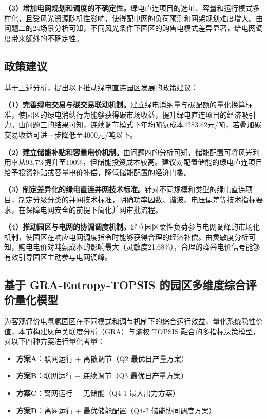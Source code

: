 \textbf{（3）增加电网规划和调度的不确定性。}绿电直连项目的选址、容量和运行模式多样化，且受风光资源随机性影响，使得配电网的负荷预测和网架规划难度增大。由问题二的24场景分析可知，不同风光条件下园区的购售电模式差异显著，给电网调度带来额外的不确定性。

\subsection{政策建议}

基于上述分析，提出以下推动绿电直连园区发展的政策建议：

\textbf{（1）完善绿电交易与碳交易联动机制。}建立绿电消纳量与碳配额的量化换算标准，使园区的绿电消纳行为能够获得碳市场收益，提升绿电直连项目的经济吸引力。由问题三的结果可知，连续调节模式下年均吨氨成本4283.62元/吨，若叠加碳交易收益可进一步降低至4000元/吨以下。

\textbf{（2）建立储能补贴和容量电价机制。}由问题四的分析可知，储能配置可将风光利用率从93.7\%提升至100\%，但储能投资成本较高。建议对配置储能的绿电直连项目给予投资补贴或容量电价补偿，降低储能配置的经济门槛。

\textbf{（3）制定差异化的绿电直连并网技术标准。}针对不同规模和类型的绿电直连项目，制定分级分类的并网技术标准，明确功率因数、谐波、电压偏差等技术指标要求，在保障电网安全的前提下简化并网审批流程。

\textbf{（4）推动园区与电网的协调调度机制。}建立园区柔性负荷参与电网调峰的市场化机制，使园区在响应电网调度指令时能够获得合理的经济补偿。由灵敏度分析可知，购电电价对吨氨成本的影响最大（灵敏度21.68\%），合理的峰谷电价信号能够有效引导园区主动参与电网调峰。

\subsection{基于 GRA-Entropy-TOPSIS 的园区多维度综合评价量化模型}

为客观评价电氢氨园区在不同模式和调节机制下的综合运行效益，量化系统隐性价值，本节构建灰色关联度分析（GRA）与熵权 TOPSIS 融合的多指标决策模型，对以下四种方案进行量化考量：
\begin{itemize}
    \item \textbf{方案A}：联网运行 + 离散调节（Q2 最优日产量方案）
    \item \textbf{方案B}：联网运行 + 连续调节（Q3 最优日产量方案）
    \item \textbf{方案C}：离网运行 + 无储能（Q4-1 最大出力方案）
    \item \textbf{方案D}：离网运行 + 最优储能配置（Q4-2 储能协同调度方案）
\end{itemize}

